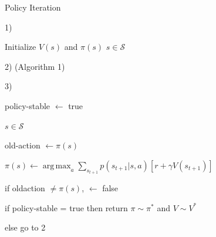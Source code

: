 \documentclass{beamer}
\DeclareMathOperator*{\argmax}{arg\,max}
\begin{document}
\begin{frame}{Policy Iteration}

\begin{algorithm}[H]
\caption{Policy Iteration for estimating $\pi \sim \pi^{*}$}

\vspace{1mm}

1) \textbf{}

Initialize $V(s)$ and $\pi(s)$  $s \in \mathcal{S}$
\vspace{3mm}


2) \textbf{} (Algorithm 1)
\vspace{3mm}

3) \textbf{}

\vspace{0.5mm}

\hspace{6mm}policy-stable $\leftarrow$ true 

\vspace{0.5mm}

 \hspace{5mm} \textbf{}  $s \in \mathcal{S}$ \textbf{} 
 
 \vspace{0.4mm}
 
 \hspace{11mm} old-action $\leftarrow \pi(s)$
 
 \vspace{0.5mm}
 
 \hspace{11mm} $\pi(s) \leftarrow \argmax_a \sum_{s_{t+1}} p(s_{t+1}|s,a) [r + \gamma V(s_{t+1})]$
 
 \vspace{0.5mm}
 
 \hspace{11mm} if old\text{-}action $\neq \pi(s)$,  $\leftarrow$ false
 
 \vspace{0.5mm}
 
 \hspace{6mm}if policy-stable = true then return $\pi \sim \pi^{*}$ and $V \sim V^{*}$
 
 \hspace{4.7mm} else go to 2
 

\vspace{1mm}
\end{algorithm}

\end{frame}
\end{document}
